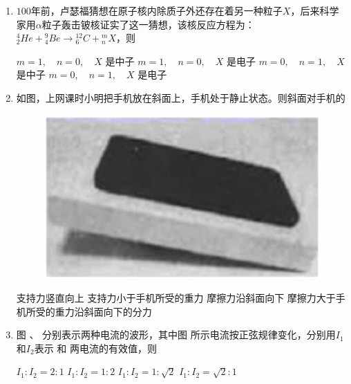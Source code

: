 




\gaokaoxz


\begin{enumerate}
\item
$ 100 $年前，卢瑟福猜想在原子核内除质子外还存在着另一种粒子$ X $，后来科学家用$ \alpha $粒子轰击铍核证实了这一猜想，该核反应方程为：${ }_{2}^{4} He+{ }_{4}^{9} Be \rightarrow{ }_{6}^{12} C+{ }_{n}^{m} X$，则 



\fourchoices
{$m=1, \quad n=0, \quad X$ 是中子}
{$m=1, \quad n=0, \quad X$ 是电子}
{$m=0, \quad n=1, \quad X$ 是中子}
{$m=0, \quad n=1, \quad X$ 是电子}



\item
如图，上网课时小明把手机放在斜面上，手机处于静止状态。则斜面对手机的  
\begin{figure}[h!]
\centering
\includegraphics[width=0.18\linewidth]{picture/screenshot092}
\end{figure}

\fourchoices
{支持力竖直向上}
{支持力小于手机所受的重力}
{摩擦力沿斜面向下}
{摩擦力大于手机所受的重力沿斜面向下的分力}



\item
图  、  分别表示两种电流的波形，其中图  所示电流按正弦规律变化，分别用$ I_{1} $和$ I_{2} $表示  和  两电流的有效值，则  
\begin{figure}[h!]
\centering
\begin{subfigure}{0.4\linewidth}
\centering
 
\caption{}\label{2020海南3a}
\end{subfigure}
\begin{subfigure}{0.4\linewidth}
\centering
 
\caption{}\label{2020海南3b}
\end{subfigure}
\end{figure}


\fourchoices
{$I_{1}: I_{2}=2: 1$}
{$I_{1}: I_{2}=1: 2$}
{$I_{1}: I_{2}=1: \sqrt{2}$}
{$I_{1}: I_{2}=\sqrt{2}: 1$}






\end{enumerate}
